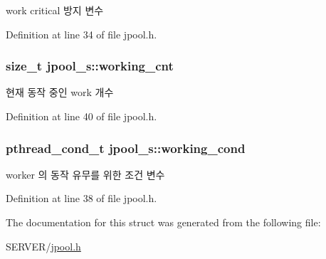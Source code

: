 work critical 방지 변수 



Definition at line 34 of file jpool.\-h.

\hypertarget{structjpool__s_a914d89a44ced20367584327bcd6c0f76}{
\subsubsection[{working\-\_\-cnt}]{\setlength{\rightskip}{0pt plus 5cm}size\-\_\-t jpool\-\_\-s\-::working\-\_\-cnt}}\label{structjpool__s_a914d89a44ced20367584327bcd6c0f76}


현재 동작 중인 work 개수 



Definition at line 40 of file jpool.\-h.

\hypertarget{structjpool__s_a947ecfa20ce4f5b9c63906232637361f}{
\subsubsection[{working\-\_\-cond}]{\setlength{\rightskip}{0pt plus 5cm}pthread\-\_\-cond\-\_\-t jpool\-\_\-s\-::working\-\_\-cond}}\label{structjpool__s_a947ecfa20ce4f5b9c63906232637361f}


worker 의 동작 유무를 위한 조건 변수 



Definition at line 38 of file jpool.\-h.



The documentation for this struct was generated from the following file\-:\begin{DoxyCompactItemize}
\item 
S\-E\-R\-V\-E\-R/\hyperlink{jpool_8h}{jpool.\-h}\end{DoxyCompactItemize}
